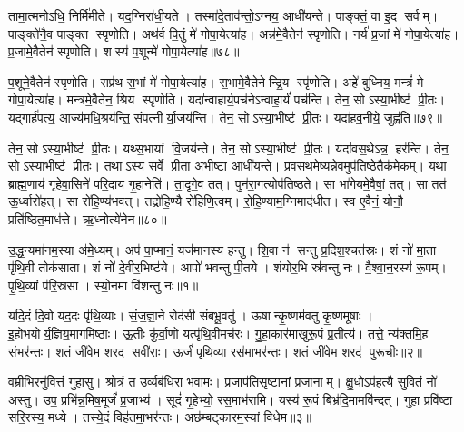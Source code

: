 तामा॒त्मनोऽधि॒ निर्मि॑मीते। यद॒ग्निरा॑धी॒यते। तस्मा॑दे॒ताव॑न्तो॒ऽग्नय॒ आधी॑यन्ते। पाङ्क्तं॒ वा इ॒द सर्वम्। पाङ्क्ते॑नै॒व पाङ्क्त स्पृणोति। अथ॑र्व पि॒तुं मे॑ गोपा॒येत्या॑ह। अन्न॑मे॒वैतेन॑ स्पृणोति। नर्य॑ प्र॒जां मे॑ गोपा॒येत्या॑ह। प्र॒जामे॒वैतेन॑ स्पृणोति। शस्य॑ प॒शून्मे॑ गोपा॒येत्या॑ह॥७८॥

प॒शूने॒वैतेन॑ स्पृणोति। सप्र॑थ स॒भां मे॑ गोपा॒येत्या॑ह। स॒भामे॒वैतेनेन्द्रि॒य स्पृ॑णोति। अहे॑ बुध्निय॒ मन्त्रं॑ मे गोपा॒येत्या॑ह। मन्त्र॑मे॒वैतेन॒ श्रिय स्पृणोति। यदा॑न्वाहार्य॒पच॑नेऽन्वाहा॒र्यं॑ पच॑न्ति। तेन॒ सोऽस्या॒भीष्ट॑ प्री॒तः। यद्गार्\mbox{}ह॑पत्य॒ आज्य॑मधि॒श्रय॑न्ति॒ संपत्नीर्या॒जय॑न्ति। तेन॒ सोऽस्या॒भीष्ट॑ प्री॒तः। यदा॑हव॒नीये॒ जुह्व॑ति॥७९॥

तेन॒ सोऽस्या॒भीष्ट॑ प्री॒तः। यथ्स॒भायां वि॒जय॑न्ते। तेन॒ सोऽस्या॒भीष्ट॑ प्री॒तः। यदा॑वस॒थेऽन्न॒ हर॑न्ति। तेन॒ सोऽस्या॒भीष्ट॑ प्री॒तः। तथाऽस्य॒ सर्वे प्री॒ता अ॒भीष्टा॒ आधी॑यन्ते। प्र॒व॒स॒थमे॒ष्यन्ने॒वमुप॑तिष्ठे॒तैक॑मेकम्। यथा ब्राह्म॒णाय॑ गृहेवा॒सिने॑ परि॒दाय॑ गृ॒हानेति॑। ता॒दृगे॒व तत्। पुन॑रा॒गत्योप॑तिष्ठते। सा भा॑गेयमे॒वैषां॒ तत्। सा तत॑ ऊ॒र्ध्वारो॑हत्। सा रो॑हि॒ण्य॑भवत्। तद्रो॑हि॒ण्यै रो॑हिणि॒त्वम्। रो॒हि॒ण्याम॒ग्निमाद॑धीत। स्व ए॒वैनं॒ योनौ॒ प्रति॑ष्ठित॒माध॑त्ते। ऋ॒ध्नोत्ये॑नेन॥८०॥\anuvakamend[ए॒षा प॒शून्मे॑ गोपा॒येति॒ प्रवि॑ष्टा प॒शून्मे॑ गोपा॒येत्या॑ह॒ जुह्व॑ति तिष्ठते स॒प्त च॑॥१०॥]




\clearpage
{}
\setcounter{anuvakam}{0}
उ॒द्ध॒न्यमा॑नम॒स्या अ॑मे॒ध्यम्। अप॑ पा॒प्मानं॒ यज॑मानस्य हन्तु। शि॒वा न॑ सन्तु प्र॒दिश॒श्चत॑स्रः। शं नो॑ मा॒ता पृ॑थि॒वी तोक॑साता। शं नो॑ दे॒वीर॒भिष्ट॑ये। आपो॑ भवन्तु पी॒तये। शंयोर॒भि स्र॑वन्तु नः। वै॒श्वा॒न॒रस्य॑ रू॒पम्। पृ॒थि॒व्यां प॑रि॒स्रसा। स्यो॒नमा वि॑शन्तु नः॥१॥

यदि॒दं दि॒वो यद॒दः पृ॑थि॒व्याः। सं॒ज॒ज्ञा॒ने रोद॑सी संबभू॒वतु॑। ऊषान्कृ॒ष्णम॑वतु कृ॒ष्णमूषाः। इ॒होभयोर्य॒ज्ञिय॒माग॑मिष्ठाः। ऊ॒तीः कु॑र्वा॒णो यत्पृ॑थि॒वीमच॑रः। गु॒हा॒कार॑माखुरू॒पं प्र॒तीत्य॑। तत्ते॒ न्य॑क्तमि॒ह सं॒भर॑न्तः। श॒तं जी॑वेम श॒रद॒ सवी॑राः। ऊर्जं॑ पृथि॒व्या रस॑मा॒भर॑न्तः। श॒तं जी॑वेम श॒रद॑ पुरू॒चीः॥२॥

व॒म्रीभि॒रनु॑वित्तं॒ गुहा॑सु। श्रोत्रं॑ त उ॒र्व्यब॑धिरा भवामः। प्र॒जाप॑तिसृष्टानां प्र॒जानाम्। क्षु॒धोऽप॑हत्यै सुवि॒तं नो॑ अस्तु। उप॒ प्रभि॑न्न॒मिष॒मूर्जं॑ प्र॒जाभ्य॑। सूदं॑ गृ॒हेभ्यो॒ रस॒माभ॑रामि। यस्य॑ रू॒पं बिभ्र॑दि॒मामवि॑न्दत्। गुहा॒ प्रवि॑ष्टा सरि॒रस्य॒ मध्ये। तस्ये॒दं विह॑तमा॒भर॑न्तः। अछ॑म्बट्कारम॒स्यां वि॑धेम॥३॥

